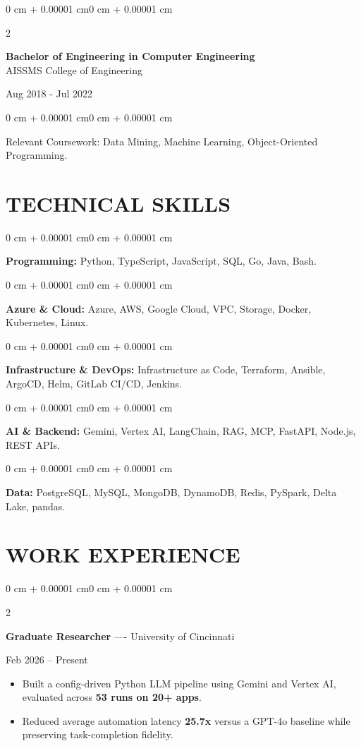 \documentclass[10pt, letterpaper]{article}
\newenvironment{highlights}{
    \begin{itemize}[
        topsep=0.10 cm,
        parsep=0.06 cm,
        partopsep=0pt,
        itemsep=0.06 cm,
        leftmargin=12pt
    ]
}{
    \end{itemize}
}
\newenvironment{onecolentry}{
    \begin{adjustwidth}{0 cm + 0.00001 cm}{0 cm + 0.00001 cm}
}{
    \end{adjustwidth}
}
\newenvironment{twocolentry}[2][]{
    \onecolentry
    \def\secondColumn{#2}
    \setcolumnwidth{\fill, 4.5 cm}
    \begin{paracol}{2}
}{
    \switchcolumn \raggedleft \secondColumn
    \end{paracol}
    \endonecolentry
}
\begin{document}
\begin{twocolentry}{
    Aug 2018 - Jul 2022
}
    \textbf{Bachelor of Engineering in Computer Engineering} \\
    AISSMS College of Engineering
\end{twocolentry}
\begin{onecolentry}
Relevant Coursework: Data Mining, Machine Learning, Object-Oriented Programming.
\end{onecolentry}
\section{TECHNICAL SKILLS}
\begin{onecolentry}
\textbf{Programming:} Python, TypeScript, JavaScript, SQL, Go, Java, Bash.
\end{onecolentry}
\vspace{0.06 cm}
\begin{onecolentry}
\textbf{Azure \& Cloud:} Azure, AWS, Google Cloud, VPC, Storage, Docker, Kubernetes, Linux.
\end{onecolentry}
\vspace{0.06 cm}
\begin{onecolentry}
\textbf{Infrastructure \& DevOps:} Infrastructure as Code, Terraform, Ansible, ArgoCD, Helm, GitLab CI/CD, Jenkins.
\end{onecolentry}
\vspace{0.06 cm}
\begin{onecolentry}
\textbf{AI \& Backend:} Gemini, Vertex AI, LangChain, RAG, MCP, FastAPI, Node.js, REST APIs.
\end{onecolentry}
\vspace{0.06 cm}
\begin{onecolentry}
\textbf{Data:} PostgreSQL, MySQL, MongoDB, DynamoDB, Redis, PySpark, Delta Lake, pandas.
\end{onecolentry}

\section{WORK EXPERIENCE}
\begin{twocolentry}{Feb 2026 -- Present}
\textbf{Graduate Researcher} ---- University of Cincinnati
\end{twocolentry}
\begin{highlights}
  \item Built a config-driven Python LLM pipeline using Gemini and Vertex AI, evaluated across \textbf{53 runs on 20+ apps}.
  \item Reduced average automation latency \textbf{25.7x} versus a GPT-4o baseline while preserving task-completion fidelity.
\end{highlights}
\end{document}
